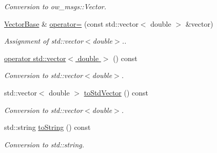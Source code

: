 \begin{DoxyCompactItemize}
\begin{DoxyCompactList}\small\item\em Conversion to ow\+\_\+msgs\+::\+Vector. \end{DoxyCompactList}\item 
\hyperlink{classow__core_1_1VectorBase}{Vector\+Base} \& \hyperlink{classow__core_1_1VectorBase_a86c55c82140b2c907ed6be603fd39a08}{operator=} (const std\+::vector$<$ double $>$ \&vector)\hypertarget{classow__core_1_1VectorBase_a86c55c82140b2c907ed6be603fd39a08}{}\label{classow__core_1_1VectorBase_a86c55c82140b2c907ed6be603fd39a08}

\begin{DoxyCompactList}\small\item\em Assignment of std\+::vector$<$double$>$.. \end{DoxyCompactList}\item 
\hyperlink{classow__core_1_1VectorBase_ab385b9317f94cc8817667261f57dfd05}{operator std\+::vector$<$ double $>$} () const \hypertarget{classow__core_1_1VectorBase_ab385b9317f94cc8817667261f57dfd05}{}\label{classow__core_1_1VectorBase_ab385b9317f94cc8817667261f57dfd05}

\begin{DoxyCompactList}\small\item\em Conversion to std\+::vector$<$double$>$. \end{DoxyCompactList}\item 
std\+::vector$<$ double $>$ \hyperlink{classow__core_1_1VectorBase_a91bc3d7bc12b8a07e2e8afba9e4cc4aa}{to\+Std\+Vector} () const \hypertarget{classow__core_1_1VectorBase_a91bc3d7bc12b8a07e2e8afba9e4cc4aa}{}\label{classow__core_1_1VectorBase_a91bc3d7bc12b8a07e2e8afba9e4cc4aa}

\begin{DoxyCompactList}\small\item\em Conversion to std\+::vector$<$double$>$. \end{DoxyCompactList}\item 
std\+::string \hyperlink{classow__core_1_1VectorBase_a250e946ef39c1ebde4b82ab1e923b327}{to\+String} () const \hypertarget{classow__core_1_1VectorBase_a250e946ef39c1ebde4b82ab1e923b327}{}\label{classow__core_1_1VectorBase_a250e946ef39c1ebde4b82ab1e923b327}

\begin{DoxyCompactList}\small\item\em Conversion to std\+::string. \end{DoxyCompactList}\end{DoxyCompactItemize}


